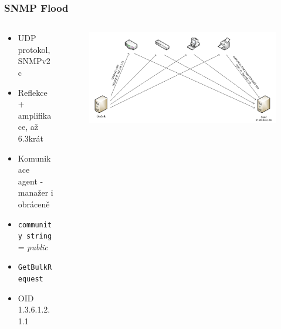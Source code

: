 \documentclass[%
  12pt,       				%
	t,                  %
	aspectratio=1610,   %
	unicode,						%
czech,              %
]{beamer}				    	%
\begin{document}
\begin{frame}
\frametitle{SNMP Flood}

\begin{columns}[T] 								%
	\begin{column}{0.4\textwidth}		%
		\begin{itemize}
			\item UDP protokol, SNMPv2c
			\item Reflekce + amplifikace, až 6.3krát
			\item Komunikace \\agent - manažer i obráceně
			\item \texttt{community	string} = \textit{public}
			\item \texttt{GetBulkRequest}
			\item OID 1.3.6.1.2.1.1
		\end{itemize}
	\end{column}
	\begin{column}{0.6\textwidth}		%
		\begin{figure}%
			\centering
			\vspace{1cm}	              %
			\includegraphics[width=1\columnwidth]{obrazky/snmp_flood_schema.png}
		\end{figure}
	\end{column}
\end{columns}											%
\end{frame}

\end{document}

